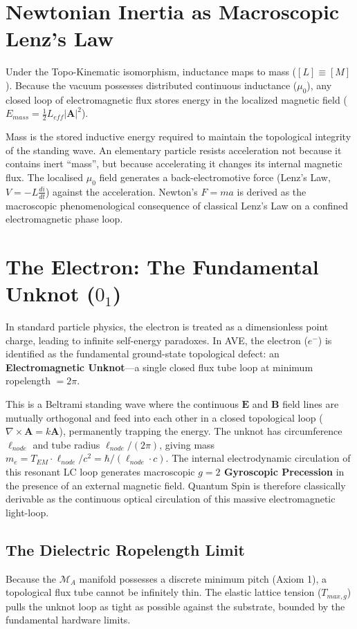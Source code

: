 \section{Newtonian Inertia as Macroscopic Lenz's Law}
Under the Topo-Kinematic isomorphism, inductance maps to mass ($[L] \equiv [M]$). Because the vacuum possesses distributed continuous inductance ($\mu_0$), any closed loop of electromagnetic flux stores energy in the localized magnetic field ($E_{mass} = \frac{1}{2} L_{eff} |\mathbf{A}|^2$).

Mass is the stored inductive energy required to maintain the topological integrity of the standing wave. An elementary particle resists acceleration not because it contains inert ``mass'', but because accelerating it changes its internal magnetic flux. The localised $\mu_0$ field generates a back-electromotive force (Lenz's Law, $V = -L \frac{di}{dt}$) against the acceleration. Newton's $F=ma$ is derived as the macroscopic phenomenological consequence of classical Lenz's Law on a confined electromagnetic phase loop.

\section{The Electron: The Fundamental Unknot ($0_1$)}
In standard particle physics, the electron is treated as a dimensionless point charge, leading to infinite self-energy paradoxes. In AVE, the electron ($e^-$) is identified as the fundamental ground-state topological defect: an \textbf{Electromagnetic Unknot}---a single closed flux tube loop at minimum ropelength $= 2\pi$. 

This is a Beltrami standing wave where the continuous $\mathbf{E}$ and $\mathbf{B}$ field lines are mutually orthogonal and feed into each other in a closed topological loop ($\nabla \times \mathbf{A} = k\mathbf{A}$), permanently trapping the energy. The unknot has circumference $\ell_{node}$ and tube radius $\ell_{node}/(2\pi)$, giving mass $m_e = T_{EM} \cdot \ell_{node}/c^2 = \hbar/(\ell_{node} \cdot c)$. The internal electrodynamic circulation of this resonant LC loop generates macroscopic \textbf{$g=2$ Gyroscopic Precession} in the presence of an external magnetic field. Quantum Spin is therefore classically derivable as the continuous optical circulation of this massive electromagnetic light-loop.

\subsection{The Dielectric Ropelength Limit}
Because the $\mathcal{M}_A$ manifold possesses a discrete minimum pitch (Axiom 1), a topological flux tube cannot be infinitely thin. The elastic lattice tension ($T_{max,g}$) pulls the unknot loop as tight as possible against the substrate, bounded by the fundamental hardware limits. 

